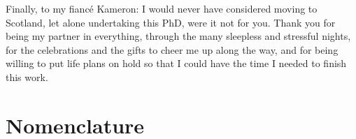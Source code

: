 \documentclass[a4paper,oneside,11pt]{book}
\begin{document}
Finally, to my fianc\'e Kameron: I would never have considered moving to Scotland, let alone
undertaking this PhD, were it not for you. Thank you for being my partner in everything,
through the many sleepless and stressful nights, for the celebrations and the gifts to
cheer me up along the way, and for being willing to put life plans on hold so that I
could have the time I needed to finish this work.


\tableofcontents
{}
\listoffigures
{}
\listoftables
{}
\listofalgorithms


\chapter*{Nomenclature}
\end{document}
